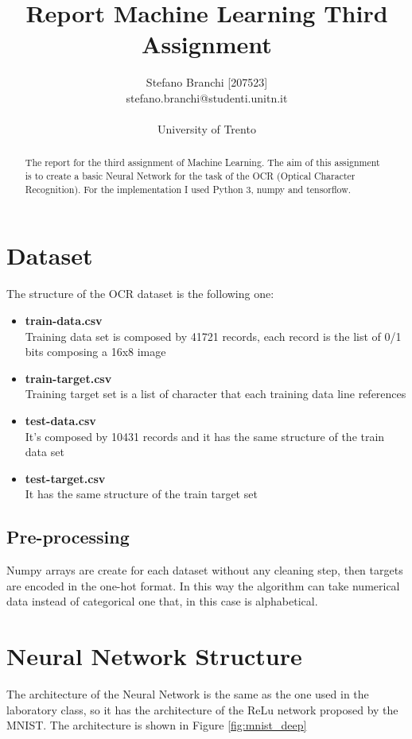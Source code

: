 \documentclass{article}
\title{Report Machine Learning Third Assignment}
\author{Stefano Branchi [207523] \\ stefano.branchi@studenti.unitn.it \\\\ University of Trento}
\date{}
\begin{document}
\maketitle

\begin{abstract}
    The report for the third assignment of Machine Learning. The aim of this assignment is to create a basic Neural Network for the task of the OCR (Optical Character Recognition). For the implementation I used Python 3, numpy and tensorflow.
\end{abstract}

\section{Dataset}
The structure of the OCR dataset is the following one:
\begin{itemize}
  \item \textbf{train-data.csv}\\ Training data set is composed by 41721 records, each record is the list of 0/1 bits composing a 16x8 image
  \item \textbf{train-target.csv} \\ Training target set is a list of character that each training data line references
  \item \textbf{test-data.csv} \\ It's composed by 10431 records and it has the same structure of the train data set
  \item \textbf{test-target.csv} \\ It has the same structure of the train target set
\end{itemize}

\subsection{Pre-processing}
Numpy arrays are create for each dataset without any cleaning step, then targets are encoded in the one-hot format. In this way the algorithm can take numerical data instead of categorical one that, in this case is alphabetical.

\section{Neural Network Structure}
The architecture of the Neural Network is the same as the one used in the laboratory class, so it has the architecture of the ReLu network proposed by the MNIST. The architecture is shown in Figure \ref{fig:mnist_deep}
\end{document}
